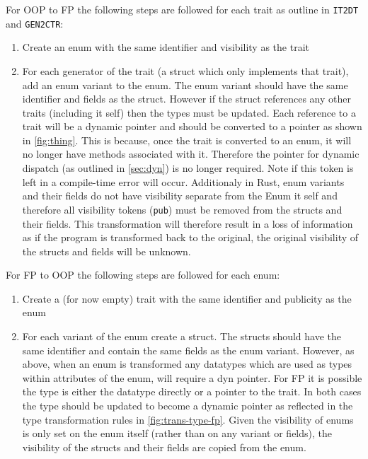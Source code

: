 \documentclass[ oneside,%
                    author={James Elgar},
                    degree={MEng},
                     title={Bidirectional transformer between functional and \\ object-oriented programming in Rust},
                  subtitle={}]{dissertation}
\newcommand{\rust}[1]{\texttt{#1}}
\begin{document}
For OOP to FP the following steps are followed for each trait as outline in \verb|IT2DT| and \verb|GEN2CTR|:
\begin{enumerate}
    \item Create an enum with the same identifier and visibility as the trait
    \item For each generator of the trait (a struct which only implements that trait), add an enum variant to the enum. The enum variant should have the same identifier and fields as the struct. However if the struct references any other traits (including it self) then the types must be updated. Each reference to a trait will be a dynamic pointer and should be converted to a pointer as shown in \autoref{fig:thing}. This is because, once the trait is converted to an enum, it will no longer have methods associated with it. Therefore the pointer for dynamic dispatch (as outlined in \autoref{sec:dyn}) is no longer required. Note if this token is left in a compile-time error will occur. 
    Additionaly in Rust, enum variants and their fields do not have visibility separate from the Enum it self and therefore all visibility tokens (\rust{pub}) must be removed from the structs and their fields. This transformation will therefore result in a loss of information as if the program is transformed back to the original, the original visibility of the structs and fields will be unknown.
\end{enumerate}

For FP to OOP the following steps are followed for each enum:
\begin{enumerate}
    \item Create a (for now empty) trait with the same identifier and publicity as the enum  
    \item For each variant of the enum create a struct. The structs should have the same identifier and contain the same fields as the enum variant.
    However, as above, when an enum is transformed any datatypes which are used as types within attributes of the enum, will require a dyn pointer. For FP it is possible the type is either the datatype directly or a pointer to the trait. In both cases the type should be updated to become a dynamic pointer as reflected in the type transformation rules in \autoref{fig:trans-type-fp}.
    Given the visibility of enums is only set on the enum itself (rather than on any variant or fields), the visibility of the structs and their fields are copied from the enum.
\end{enumerate}
\end{document}
